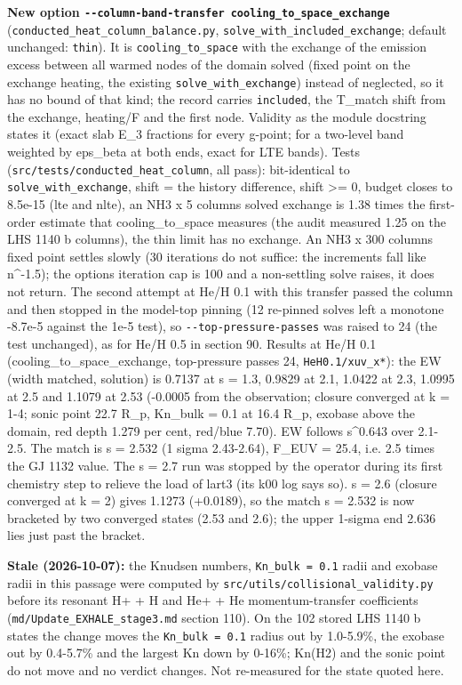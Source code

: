 \documentclass[english,a4paper]{my_memo}
\begin{document}
\textbf{New option \texttt{-\/-column-band-transfer\ cooling\_to\_space\_exchange}}
(\texttt{conducted\_heat\_column\_balance.py}, \texttt{solve\_with\_included\_exchange}; default
unchanged: \texttt{thin}). It is \texttt{cooling\_to\_space} with the exchange of the
emission excess between all warmed nodes of the domain solved (fixed point
on the exchange heating, the existing \texttt{solve\_with\_exchange}) instead of
neglected, so it has no bound of that kind; the record carries
\texttt{included}, the T\_match shift from the exchange, heating/F and the first
node. Validity as the module docstring states it (exact slab E\_3 fractions
for every g-point; for a two-level band weighted by eps\_beta at both ends,
exact for LTE bands). Tests (\texttt{src/tests/conducted\_heat\_column}, all pass):
bit-identical to \texttt{solve\_with\_exchange}, shift = the history difference,
shift \textgreater= 0, budget closes to 8.5e-15 (lte and nlte), an NH3 x 5 column\textquotesingle s
solved exchange is 1.38 times the first-order estimate that
cooling\_to\_space measures (the audit measured 1.25 on the LHS 1140 b
columns), the thin limit has no exchange. An NH3 x 300 column\textquotesingle s fixed
point settles slowly (30 iterations do not suffice: the increments fall
like n\^{}-1.5); the option\textquotesingle s iteration cap is 100 and a non-settling solve
raises, it does not return. The second attempt at He/H 0.1 with this
transfer passed the column and then stopped in the model-top pinning (12
re-pinned solves left a monotone -8.7e-5 against the 1e-5 test), so
\texttt{-\/-top-pressure-passes} was raised to 24 (the test unchanged), as for He/H
0.5 in section 90. Results at He/H 0.1 (cooling\_to\_space\_exchange, top-pressure passes 24,
\texttt{HeH0.1/xuv\_x*}): the EW (width matched, solution) is 0.7137 at s = 1.3,
0.9829 at 2.1, 1.0422 at 2.3, 1.0995 at 2.5 and 1.1079 at 2.53 (-0.0005
from the observation; closure converged at k = 1-4; sonic point 22.7 R\_p,
Kn\_bulk = 0.1 at 16.4 R\_p, exobase above the domain, red depth 1.279 per
cent, red/blue 7.70). EW follows s\^{}0.643 over 2.1-2.5. The match is s = 2.532
(1 sigma 2.43-2.64), F\_EUV = 25.4, i.e. 2.5 times the GJ 1132 value. The s =
2.7 run was stopped by the operator during its first chemistry step to
relieve the load of lart3 (its k00 log says so). s = 2.6 (closure converged at
k = 2) gives 1.1273 (+0.0189), so the match s = 2.532 is now bracketed by two
converged states (2.53 and 2.6); the upper 1-sigma end 2.636 lies just past
the bracket.

\textbf{Stale (2026-10-07):} the Knudsen numbers, \texttt{Kn\_bulk\ =\ 0.1} radii and exobase radii in this passage were computed by \texttt{src/utils/collisional\_validity.py} before its resonant H+ + H and He+ + He momentum-transfer coefficients (\texttt{md/Update\_EXHALE\_stage3.md} section 110). On the 102 stored LHS 1140 b states the change moves the \texttt{Kn\_bulk\ =\ 0.1} radius out by 1.0-5.9\%, the exobase out by 0.4-5.7\% and the largest Kn down by 0-16\%; Kn(H2) and the sonic point do not move and no verdict changes. Not re-measured for the state quoted here.
\end{document}
